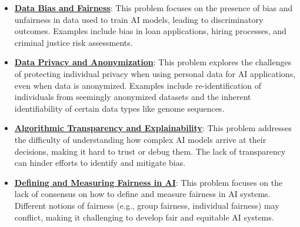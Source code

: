 \documentclass{article}%
\begin{document}
\begin{itemize}[leftmargin=*]%
\item \href{https://purdue.brightspace.com/d2l/common/assets/pdfjs-d2l-dist/1.0.14-legacy/web/viewer.html?file=\%2Fcontent\%2Fenforced\%2F1095467-wl.202510.CS.24300.001\%2F16L2-ethics.pdf\%3Fou\%3D1095467\&lang=en-us\&container=d2l-fileviewer-rendered-pdf\&fullscreen=d2l-fileviewer-rendered-pdf-dialog\&height=667#page=2}{\textbf{Data Bias and Fairness}}: This problem focuses on the presence of bias and unfairness in data used to train AI models, leading to discriminatory outcomes. Examples include bias in loan applications, hiring processes, and criminal justice risk assessments.%
\item \href{https://purdue.brightspace.com/d2l/common/assets/pdfjs-d2l-dist/1.0.14-legacy/web/viewer.html?file=\%2Fcontent\%2Fenforced\%2F1095467-wl.202510.CS.24300.001\%2F16L2-ethics.pdf\%3Fou\%3D1095467\&lang=en-us\&container=d2l-fileviewer-rendered-pdf\&fullscreen=d2l-fileviewer-rendered-pdf-dialog\&height=667#page=10}{\textbf{Data Privacy and Anonymization}}: This problem explores the challenges of protecting individual privacy when using personal data for AI applications, even when data is anonymized. Examples include re-identification of individuals from seemingly anonymized datasets and the inherent identifiability of certain data types like genome sequences.%
\item \href{https://purdue.brightspace.com/d2l/common/assets/pdfjs-d2l-dist/1.0.14-legacy/web/viewer.html?file=\%2Fcontent\%2Fenforced\%2F1095467-wl.202510.CS.24300.001\%2F16L2-ethics.pdf\%3Fou\%3D1095467\&lang=en-us\&container=d2l-fileviewer-rendered-pdf\&fullscreen=d2l-fileviewer-rendered-pdf-dialog\&height=667#page=28}{\textbf{Algorithmic Transparency and Explainability}}: This problem addresses the difficulty of understanding how complex AI models arrive at their decisions, making it hard to trust or debug them. The lack of transparency can hinder efforts to identify and mitigate bias.%
\item \href{https://purdue.brightspace.com/d2l/common/assets/pdfjs-d2l-dist/1.0.14-legacy/web/viewer.html?file=\%2Fcontent\%2Fenforced\%2F1095467-wl.202510.CS.24300.001\%2F16L2-ethics.pdf\%3Fou\%3D1095467\&lang=en-us\&container=d2l-fileviewer-rendered-pdf\&fullscreen=d2l-fileviewer-rendered-pdf-dialog\&height=667#page=19}{\textbf{Defining and Measuring Fairness in AI}}: This problem focuses on the lack of consensus on how to define and measure fairness in AI systems. Different notions of fairness (e.g., group fairness, individual fairness) may conflict, making it challenging to develop fair and equitable AI systems.%

\end{itemize}
\end{document}
